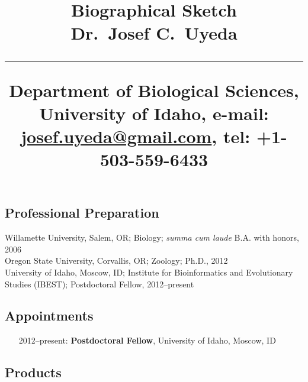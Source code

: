 \documentclass[svgnames,11pt]{article}
\title{%
        \vspace{-2\baselineskip}
            \normalsize
            Biographical Sketch\\
            {\large\textbf{Dr.~Josef C.~Uyeda}}\\
            \vspace{0.5\baselineskip}
            \hrule
            \vspace{0.5\baselineskip}
            Department of Biological Sciences, University of Idaho,
            e-mail: \href{mailto:josef.uyeda@gmail.com}{josef.uyeda@gmail.com},
            tel: +1-503-559-6433
        \vspace{-1.5ex}
        }
\date{}
\author{}
\begin{document}
\maketitle
\vspace{-4\baselineskip}

\subsection{Professional Preparation}

    Willamette University, Salem, OR;
        Biology; \textit{summa cum laude}
        B.A. with honors, 2006
        \\
    Oregon State University, Corvallis, OR;
        Zoology;
        Ph.D., 2012
        \\
    University of Idaho, Moscow, ID;
        Institute for Bioinformatics and Evolutionary Studies (IBEST);
        Postdoctoral Fellow, 2012--present

\subsection{Appointments}

\begin{itemize}[label={--9999:},leftmargin=*,itemsep=0pt]

    \item[2012--present:]
        \textbf{Postdoctoral Fellow},
        University of Idaho,
        Moscow, ID
\end{itemize}

\subsection{Products}
\end{document}
